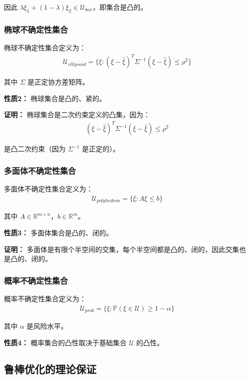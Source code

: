 因此 $\lambda \xi_1 + (1-\lambda) \xi_2 \in \mathcal{U}_{box}$，即集合是凸的。

\subsubsection{椭球不确定性集合}

椭球不确定性集合定义为：
\begin{align}
\mathcal{U}_{ellipsoid} = \{\xi : (\xi - \hat{\xi})^T \Sigma^{-1} (\xi - \hat{\xi}) \leq \rho^2\}
\end{align}

其中 $\Sigma$ 是正定协方差矩阵。

\textbf{性质2：} 椭球集合是凸的、紧的。

\textbf{证明：}
椭球集合是二次约束定义的凸集，因为：
\begin{align}
(\xi - \hat{\xi})^T \Sigma^{-1} (\xi - \hat{\xi}) \leq \rho^2
\end{align}

是凸二次约束（因为 $\Sigma^{-1}$ 是正定的）。

\subsubsection{多面体不确定性集合}

多面体不确定性集合定义为：
\begin{align}
\mathcal{U}_{polyhedron} = \{\xi : A\xi \leq b\}
\end{align}

其中 $A \in \mathbb{R}^{m \times n}$，$b \in \mathbb{R}^m$。

\textbf{性质3：} 多面体集合是凸的、闭的。

\textbf{证明：}
多面体是有限个半空间的交集，每个半空间都是凸的、闭的，因此交集也是凸的、闭的。

\subsubsection{概率不确定性集合}

概率不确定性集合定义为：
\begin{align}
\mathcal{U}_{prob} = \{\xi : \mathbb{P}(\xi \in \mathcal{U}) \geq 1 - \alpha\}
\end{align}

其中 $\alpha$ 是风险水平。

\textbf{性质4：} 概率集合的凸性取决于基础集合 $\mathcal{U}$ 的凸性。

\subsection{鲁棒优化的理论保证}

